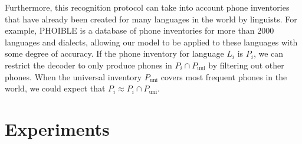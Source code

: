\documentclass{article}
\begin{document}
Furthermore, this recognition protocol can take into account phone inventories that have already been created for many languages in the world by linguists.
For example, PHOIBLE \cite{phoible} is a database of phone inventories for more than 2000 languages and dialects, allowing our model to be applied to these languages with some degree of accuracy.
If the phone inventory for language $L_i$ is $P_i$, we can restrict the decoder to only produce phones in $P_i \cap P_{\text{uni}}$ by filtering out other phones.
When the universal inventory $P_{\text{uni}}$ covers most frequent phones in the world, we could expect that $P_i \approx P_i \cap P_{\text{uni}}$.%





\section{Experiments}
\end{document}

